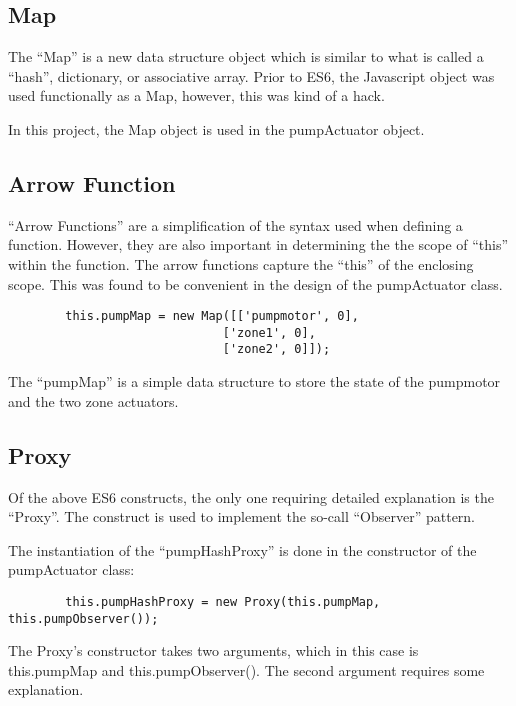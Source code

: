 \subsection{Map}

The ``Map'' is a new data structure object which is similar to what is called a 
``hash'', dictionary, or associative array.  Prior to ES6, the Javascript 
object was used functionally as a Map, however, this was kind of a hack.

In this project, the Map object is used in the pumpActuator object.

\subsection{Arrow Function}

``Arrow Functions'' are a simplification of the syntax used when defining a 
function.  However, they are also important in determining the the scope of 
``this'' within the function.  The arrow functions capture the ``this'' of the 
enclosing scope.  This was found to be convenient in the design of the 
pumpActuator class.

\begin{verbatim}
        this.pumpMap = new Map([['pumpmotor', 0],
                              ['zone1', 0],
                              ['zone2', 0]]);
\end{verbatim}

The ``pumpMap'' is a simple data structure to store the state of the pumpmotor 
and the two zone actuators.

\subsection{Proxy}

Of the above ES6 constructs, the only one requiring detailed explanation is the 
``Proxy''.  The construct is used to implement the so-call ``Observer'' pattern.

The instantiation of the ``pumpHashProxy'' is done in the constructor of the 
pumpActuator class:

\begin{verbatim}
        this.pumpHashProxy = new Proxy(this.pumpMap, this.pumpObserver());
\end{verbatim}

The Proxy's constructor takes two arguments, which in this case is this.pumpMap 
and this.pumpObserver().  The second argument requires some explanation.


